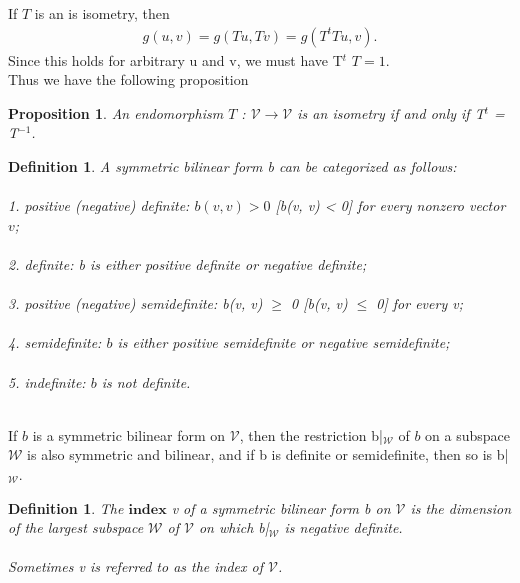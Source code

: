 \documentclass[12pt,a4paper]{article}
\newtheorem{defn}[thm]{Definition}
\newtheorem{prop}{Proposition}
\begin{document}
If $T$ is an is isometry, then
\begin{align*}
g(u, v) = g(Tu, Tv) = g(T^t Tu, v).
\end{align*}
Since this holds for arbitrary u and v, we must have T$^t$
$T = 1$.\\ Thus we have the following proposition
\begin{prop}
An endomorphism $T$ : $\mathcal{V}$$\to$$\mathcal{V}$ is an isometry if and only
if T$^t$ = T$^{-1}$.
\end{prop}
\begin{defn} 
A symmetric bilinear form b can be categorized as follows:
\\\\
1. positive (negative) definite: $b(v, v) > 0$ [b(v, v) < 0] for every
nonzero vector $v$;\\\\
2. definite: b is either positive definite or negative definite;\\\\
3. positive (negative) semidefinite: b(v, v) $\geq$ 0 [b(v, v) $\leq$ 0] for every v;\\\\
4. semidefinite: $b$ is either positive semidefinite or negative semidefinite;\\\\
5. indefinite: $b$ is not definite.\\\\
\end{defn}
If $b$ is a symmetric bilinear form on $\mathcal{V}$, then the restriction b|$_\mathcal{W}$ of $b$ on a
subspace $\mathcal{W}$ is also symmetric and bilinear, and if b is definite or semidefinite, then so is b|$_\mathcal{W}$.
\begin{defn}
The $\textbf{index}$ v of a symmetric bilinear form b on $\mathcal{V}$ is the
dimension of the largest subspace $\mathcal{W}$ of $\mathcal{V}$ on which b|$_\mathcal{W}$ is negative definite.\\\\
Sometimes v is referred to as the index of $\mathcal{V}$.
\end{defn}
\end{document}
